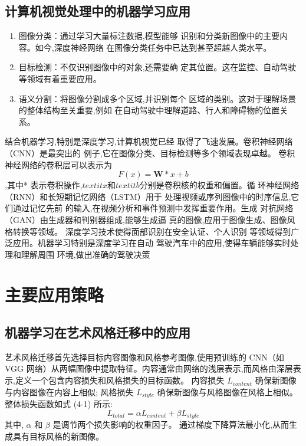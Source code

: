 \documentclass[a4paper]{article}
\newcommand{\sectionbreak}{\clearpage} %
\theoremstyle{definition}
\theoremstyle{plain}
\theoremstyle{remark}
\begin{document}
\subsection{计算机视觉处理中的机器学习应用}
\begin{enumerate}
	\item 图像分类：通过学习大量标注数据,模型能够
	识别和分类新图像中的主要内容。如今,深度神经网络
	在图像分类任务中已达到甚至超越人类水平。
	\item 目标检测：不仅识别图像中的对象,还需要确
	定其位置。这在监控、自动驾驶等领域有着重要应用。
	\item 语义分割：将图像分割成多个区域,并识别每个
	区域的类别。这对于理解场景的整体结构至关重要,例如
	在自动驾驶中理解道路、行人和障碍物的位置关系。
	\end{enumerate}
结合机器学习,特别是深度学习,计算机视觉已经
取得了飞速发展。卷积神经网络（CNN）是最突出的
例子,它在图像分类、目标检测等多个领域表现卓越。
卷积神经网络的卷积层可以表示为
\begin{equation}
	F(x) = \mathbf{W} * x + b
	\end{equation},其中*
表示卷积操作,$textit{x}$和$textit{b}$分别是卷积核的权重和偏置。循
环神经网络（RNN）和长短期记忆网络（LSTM）用于
处理视频或序列图像中的时序信息,它们通过记忆先前
的输入,在视频分析和事件预测中发挥重要作用。生成
对抗网络（GAN）由生成器和判别器组成,能够生成逼
真的图像,应用于图像生成、图像风格转换等领域。
深度学习技术使得面部识别在安全认证、个人识别
等领域得到广泛应用。机器学习特别是深度学习在自动
驾驶汽车中的应用,使得车辆能够实时处理和理解周围
环境,做出准确的驾驶决策

\sectionbreak

\section{主要应用策略}
\subsection{机器学习在艺术风格迁移中的应用}
艺术风格迁移首先选择目标内容图像和风格参考图像,使用预训练的 CNN（如 VGG 网络）从两幅图像中提取特征。内容通常由网络的浅层表示,而风格由深层表示,定义一个包含内容损失和风格损失的目标函数。
内容损失 $L_{content}$ 确保新图像与内容图像在内容上相似;
风格损失 $L_{style}$ 确保新图像与风格图像在风格上相似。整体损失函数如式 (4-1) 所示:
\begin{equation}
L_{total} = \alpha L_{content} + \beta L_{style}
\end{equation}
其中, $\alpha$ 和 $\beta$ 是调节两个损失影响的权重因子。
通过梯度下降算法最小化,从而生成具有目标风格的新图像。
\end{document}

